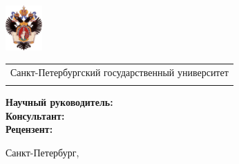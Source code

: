 \documentclass
  [ russian
  , aspectratio=169 %
  ] {beamer}
\title[Определение кода Голланда]{\my@title@title@ru}
\author[\my@title@author@ru]{\my@title@author@ru}
\institute[СПбГУ]{}
\date[14 июня 2025 г.]{}
\makeatletter
\newcommand{\advisorChair}{\my@title@chair@ru}
\newcommand{\supervisor}{\my@title@supervisor@ru}
\newcommand{\supervisorPosition}{\my@title@supervisorPosition@ru}
\newcommand{\consultant}{\my@title@consultant@ru}
\newcommand{\consultantPosition}{\my@title@consultantPosition@ru}
\newcommand{\reviewer}{\my@title@reviewer@ru}
\newcommand{\reviewerPosition}{\my@title@reviewerPosition@ru}
\newcommand{\defenseYear}{\my@title@year@ru}
\makeatother
\begin{document}
{
\begin{frame}
    \includegraphics[width=1.4cm]{figures/SPbGU_Logo.png}
    \vspace{-30pt}
    \hspace{-10pt}
    \begin{center}
        \begin{tabular}{c}
            \small{Санкт-Петербургский государственный университет} \\
            \small{\advisorChair}
        \end{tabular}
        \titlepage
        \vspace{-3em}
    \end{center}

    {\small
        \textbf{Научный руководитель:}  \supervisorPosition~\supervisor \\
        \textbf{Консультант:}  \consultantPosition~\consultant \\
        \textbf{Рецензент:} \reviewerPosition~\reviewer \\
    }
    \makeatother
    \vspace{1.5em}
    
    \begin{center}
        \small{Санкт-Петербург, \defenseYear}
    \end{center}
\end{frame}
}
\end{document}
